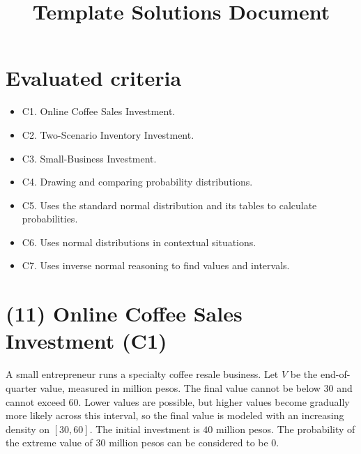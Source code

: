 \makeatletter
{}
\makeatother






\title{Template Solutions Document}
\author{}
\date{}


	\maketitle
	
	\setcounter{tocdepth}{1}
	\setcounter{secnumdepth}{2}
	\label{toc}
	\tableofcontents
	
	\section*{Evaluated criteria}
	\begin{itemize}
		\item C1. Online Coffee Sales Investment.
		\item C2. Two-Scenario Inventory Investment.
		\item C3. Small-Business Investment.
		\item C4. Drawing and comparing probability distributions.
		\item C5. Uses the standard normal distribution and its tables to calculate probabilities.
		\item C6. Uses normal distributions in contextual situations.
		\item C7. Uses inverse normal reasoning to find values and intervals.
	\end{itemize}
	
	\section{(11) Online Coffee Sales Investment (C1)}
	\label{sec:online-coffee-sales-investment-c1}
	
	A small entrepreneur runs a specialty coffee resale business. Let $V$ be the end-of-quarter value, measured in million pesos. The final value cannot be below $30$ and cannot exceed $60$. Lower values are possible, but higher values become gradually more likely across this interval, so the final value is modeled with an increasing density on $[30,60]$. The initial investment is $40$ million pesos. The probability of the extreme value of 30 million pesos can be considered to be 0.
	
